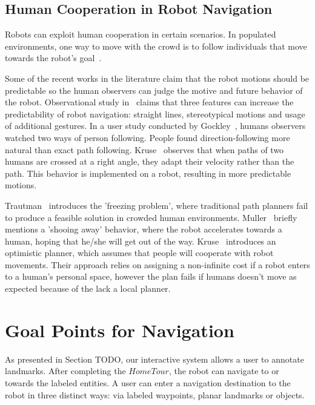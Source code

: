 \subsection{Human Cooperation in Robot Navigation}

Robots can exploit human cooperation in certain scenarios. In populated environments, one way to move with the crowd is to follow individuals that move towards the robot's goal~\cite{stein2012robot,muller2008socially}. 

Some of the recent works in the literature claim that the robot motions should be predictable so the human observers can judge the motive and future behavior of the robot. Observational study in~\cite{lichtenthaler2013towards} claims that three features can increase the predictability of robot navigation: straight lines, stereotypical motions and usage of additional gestures. In a user study conducted by Gockley~\cite{gockley2007natural}, humans observers watched two ways of person following. People found direction-following more natural than exact path following. Kruse~\cite{kruse2012legible} observes that when paths of two humans are crossed at a right angle, they adapt their velocity rather than the path. This behavior is implemented on a robot, resulting in more predictable motions. 

Trautman~\cite{trautman2010unfreezing} introduces the 'freezing problem', where traditional path planners fail to produce a feasible solution in crowded human environments. Muller~\cite{muller2008socially} briefly mentions a 'shooing away' behavior, where the robot accelerates towards a human, hoping that he/she will get out of the way. Kruse~\cite{kruse2010exploiting} introduces an optimistic planner, which assumes that people will cooperate with robot movements. Their approach relies on assigning a non-infinite cost if a robot enters to a human's personal space, however the plan fails if humans doesn't move as expected because of the lack a local planner.


\section{Goal Points for Navigation}
\label{sec:navigation_finding_goal_points_for_navigation}

As presented in Section TODO, our interactive system allows a user to annotate landmarks. After completing the $Home Tour$, the robot can navigate to or towards the labeled entities.
A user can enter a navigation destination to the robot in three distinct ways: via labeled waypoints, planar landmarks or objects.

